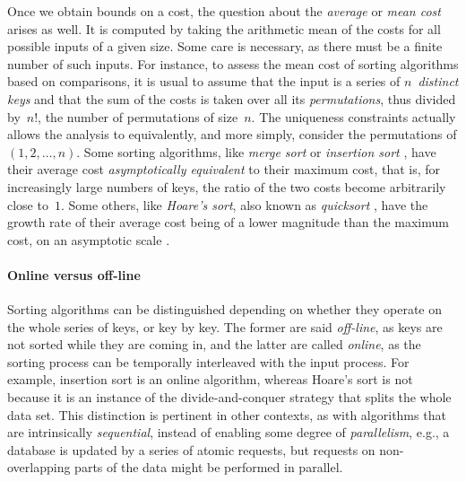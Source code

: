 Once we obtain bounds on a cost, the question about the \emph{average}
or \emph{mean cost} \citep{VitterFlajolet_1990}
\citep[\S{}1.2.10]{Knuth_1997} arises as well. It is computed by
taking the arithmetic mean of the costs for all possible inputs of a
given size. Some care is necessary, as there must be a finite number
of such inputs. For instance, to assess the mean cost of sorting
algorithms based on comparisons, it is usual to assume that the input
is a series of \(n\)~\emph{distinct
  keys} and that the sum of the costs is
taken over all its \emph{permutations}, thus
divided by~\(n!\), the number of permutations of size~\(n\). The
uniqueness constraints actually allows the analysis to equivalently,
and more simply, consider the permutations of \((1,2,\dots,n)\). Some
sorting algorithms, like \emph{merge sort}
\cite[\S{}5.2.4]{Knuth_1998} \cite[\S{}2.3]{CLRS_2009} or
\emph{insertion sort} \cite[\S{}5.2.1]{Knuth_1998}
\cite[\S{}2.1]{CLRS_2009}, have their average cost
\emph{asymptotically equivalent} to their maximum cost, that is, for
increasingly large numbers of keys, the ratio of the two costs become
arbitrarily close to~\(1\). Some others,
like \emph{Hoare's sort}, also known as \emph{quicksort}
\cite[\S{}5.2.2]{Knuth_1998} \cite[\S{}7]{CLRS_2009}, have the growth
rate of their average cost being of a lower magnitude than the maximum
cost, on an asymptotic scale \cite[\S{}9]{GrahamKnuthPatashnik_1994}.

\paragraph{Online versus off-line}
\label{par:online_vs_offline}

Sorting algorithms can be distinguished depending on whether they
operate on the whole series of keys, or key by key. The former are
said \emph{off\hyp{}line}, as keys are not
sorted while they are coming in, and the latter are called
\emph{online}, as the sorting process can be
temporally interleaved with the input process. For example, insertion
sort is an online algorithm, whereas Hoare's sort is not because it is
an instance of the divide\hyp{}and\hyp{}conquer strategy that splits
the whole data set. This distinction is pertinent in other contexts,
as with algorithms that are intrinsically \emph{sequential}, instead
of enabling some degree of \emph{parallelism}, e.g., a database is
updated by a series of atomic requests, but requests on
non\hyp{}overlapping parts of the data might be performed in parallel.

